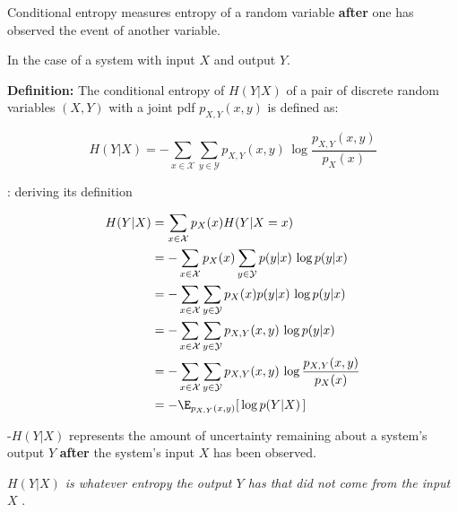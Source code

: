 \begin{frame}{\subsecname}

Conditional entropy measures entropy of a random variable \textbf{after} one has observed the event of another variable.

\end{frame}

\begin{frame}{\subsecname}

In the case of a system with input $X$ and output $Y$.\\

\svspace{3mm}

\textbf{Definition:} 
The conditional entropy of $H(Y|X)$ of a pair of discrete random variables $(X,Y)$ with a joint pdf $p_{X,Y}(x,y)$ is defined as:

\begin{equation}
\label{eq:entropycond}
H(Y|X) = -\sum_{x \in \mathcal{X}} \sum_{y \in \mathcal{Y}} p_{X,Y}(x,y)\,\log \frac{p_{X,Y}(x,y)}{p_X(x)}
\end{equation}


\end{frame}

\begin{frame}{\subsecname: deriving its definition}

\begin{align}
H(Y|X) 
&= \sum_{x \in \mathcal{X}} p_X(x) H(Y|X=x) \\
&= -\sum_{x \in \mathcal{X}} p_X(x) \sum_{y \in \mathcal{Y}} p(y|x)\,\log p(y|x) \\
&= -\sum_{x \in \mathcal{X}} \sum_{y \in \mathcal{Y}} p_X(x) p(y|x)\,\log p(y|x) \\
&= -\sum_{x \in \mathcal{X}} \sum_{y \in \mathcal{Y}} p_{X,Y}(x,y)\,\log p(y|x) \\
&= -\sum_{x \in \mathcal{X}} \sum_{y \in \mathcal{Y}} p_{X,Y}(x,y)\,\log \frac{p_{X,Y}(x,y)}{p_X(x)} \\
&= -\E_{p_{X,Y}(x,y)} \lbrack \, \log p(Y|X) \, \rbrack
\end{align}

\end{frame}

\begin{frame}{\subsecname}


-$H(Y|X)$ represents the amount of uncertainty remaining about a system's output $Y$ \textbf{after} the 
system's input $X$ has been observed.

\pause


\pause

\emph{
$H(Y|X)$ is whatever entropy the output $Y$ has that did not come from the input $X$
}
.



\end{frame}

